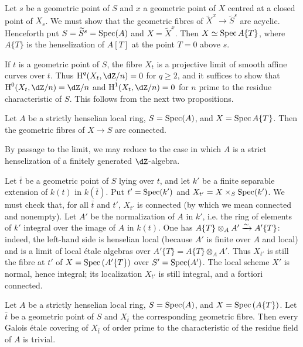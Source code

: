 Let $s$ be a geometric point of $S$ and $x$ a geometric point of $X$
centred at a closed point of $X_s$. We must show that the geometric fibres
of $\widetilde X^x\to\widetilde S^s$ are acyclic. Henceforth put
$S=\widetilde S^s=\operatorname{Spec}(A)$ and $X=\widetilde X^x$. Then
$X\simeq\operatorname{Spec} A\{T\}$, where $A\{T\}$ is the henselization of $A[T]$
at the point $T=0$ above $s$.

If $t$ is a geometric point of $S$, the fibre $X_t$ is a projective
limit of smooth affine curves over $t$. Thus $\h^q(X_t,\dZ/n)=0$ for
$q\geqslant2$, and it suffices to show that
$\h^0(X_t,\dZ/n)=\dZ/n$ and $\h^1(X_t,\dZ/n)=0$ for $n$ prime to the
residue characteristic of $S$. This follows from the next two
propositions.

\begin{proposition}\label{I:5-2-2}
Let $A$ be a strictly henselian local ring, $S=\operatorname{Spec}(A)$, and
$X=\operatorname{Spec} A\{T\}$. Then the geometric fibres of $X\to S$ are connected.
\end{proposition}

By passage to the limit, we may reduce to the case in which $A$ is a
strict henselization of a finitely generated $\dZ$-algebra.

Let $\bar t$ be a geometric point of $S$ lying over $t$, and let $k'$
be a finite separable extension of $k(t)$ in $k(\bar t)$. Put
$t'=\operatorname{Spec}(k')$ and $X_{t'}=X\times_S\operatorname{Spec}(k')$. We must check that, for
all $\bar t$ and $t'$, $X_{t'}$ is connected (by which we mean connected
and nonempty). Let $A'$ be the normalization of $A$ in $k'$, i.e. the
ring of elements of $k'$ integral over the image of $A$ in $k(t)$. One
has $A\{T\}\otimes_AA'\xrightarrow\sim A'\{T\}$: indeed, the left-hand side is
henselian local (because $A'$ is finite over $A$ and local) and is a
limit of local étale algebras over
$A'\{T\}=A\{T\}\otimes_AA'$. Thus $X_{t'}$ is still the fibre at $t'$
of $X=\operatorname{Spec}\left(A'\{T\}\right)$ over $S'=\operatorname{Spec}(A')$. The local scheme
$X'$ is normal, hence integral; its localization $X_{t'}$ is still
integral, and a fortiori connected.

\begin{proposition}\label{I:5-2-3}
Let $A$ be a strictly henselian local ring, $S=\operatorname{Spec}(A)$, and
$X=\operatorname{Spec}\left(A\{T\}\right)$. Let $\bar t$ be a geometric point of $S$
and $X_{\bar t}$ the corresponding geometric fibre. Then every Galois
étale covering of $X_{\bar t}$ of order prime to the characteristic of
the residue field of $A$ is trivial.
\end{proposition}


